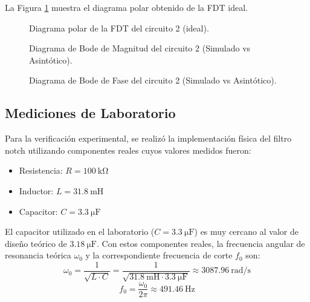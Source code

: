 La Figura \ref{fig:polar_circuito_2} muestra el diagrama polar obtenido de la FDT ideal.

\begin{figure}[H]
  \centering
  
  \caption{Diagrama polar de la FDT del circuito 2 (ideal).}
  \label{fig:polar_circuito_2}
\end{figure}

\begin{figure}[H]
  \centering
  
  \caption{Diagrama de Bode de Magnitud del circuito 2 (Simulado vs Asintótico).}
  \label{fig:bode_mag_circuito_2}
\end{figure}

\begin{figure}[H]
  \centering
  
  \caption{Diagrama de Bode de Fase del circuito 2 (Simulado vs Asintótico).}
  \label{fig:bode_phase_circuito_2}
\end{figure}

\subsection{Mediciones de Laboratorio}
\label{sec:mediciones_circ_2}

Para la verificación experimental, se realizó la implementación física del filtro notch utilizando componentes reales cuyos valores medidos fueron:
\begin{itemize}
  \item Resistencia: $R = \SI{100}{\kilo\ohm}$
  \item Inductor: $L = \SI{31.8}{\milli\henry}$
  \item Capacitor: $C = \SI{3.3}{\micro\farad}$
\end{itemize}

El capacitor utilizado en el laboratorio ($C = \SI{3.3}{\micro\farad}$) es muy cercano al valor de diseño teórico de $\SI{3.18}{\micro\farad}$. Con estos componentes reales, la frecuencia angular de resonancia teórica $\omega_0$ y la correspondiente frecuencia de corte $f_0$ son:
\begin{equation}
  \omega_0 = \frac{1}{\sqrt{L \cdot C}} = \frac{1}{\sqrt{\SI{31.8}{\milli\henry} \cdot \SI{3.3}{\micro\farad}}} \approx \SI{3087.96}{\radian\per\second}
\end{equation}
\begin{equation}
  f_0 = \frac{\omega_0}{2\pi} \approx \SI{491.46}{\hertz}
\end{equation}

